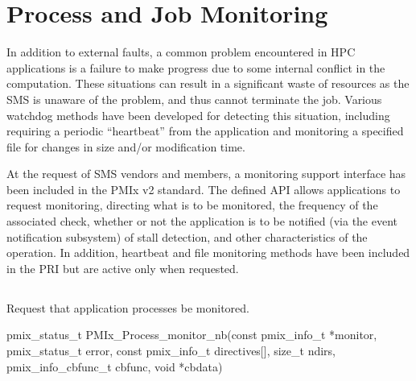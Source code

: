 \section{Process and Job Monitoring}
\label{chap:api_job_mgmt:monitor}

In addition to external faults, a common problem encountered in \ac{HPC} applications is a failure to make
progress due to some internal conflict in the computation. These situations can
result in a significant waste of resources as the \ac{SMS} is unaware of the problem, and thus cannot terminate the
job. Various watchdog methods have been developed for detecting this situation, including requiring a periodic ``heartbeat''
from the application and monitoring a specified file for changes in size and/or modification time.

At the request of \ac{SMS} vendors and members, a monitoring support interface has been included in the PMIx v2 standard. The defined \ac{API} allows applications to request monitoring, directing what is to be monitored, the frequency of the associated check, whether or not the application is to be notified (via the event notification subsystem) of stall detection, and other characteristics of the operation. In addition, heartbeat and file monitoring methods have been included in the \ac{PRI} but are active only when requested.

\subsection{}

\summary

Request that application processes be monitored.

\format

\cspecificstart
\begin{codepar}
pmix_status_t
PMIx_Process_monitor_nb(const pmix_info_t *monitor, pmix_status_t error,
                        const pmix_info_t directives[], size_t ndirs,
                        pmix_info_cbfunc_t cbfunc, void *cbdata)
\end{codepar}
\cspecificend

\begin{arglist}
\end{arglist}

